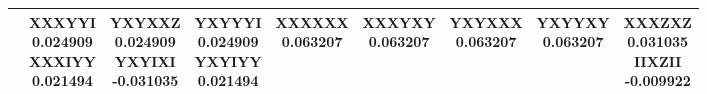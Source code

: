 \documentclass[twocolumn]{revtex4-1}
\newcommand{\1}{\mathbbm{1}}
\begin{document}
\begin{longtable}{|c|c|c|c|c|c|c|c|c|}
{\vspace{.5\baselineskip}}
&
\parbox{1.9cm}{\centering\vspace{.5\baselineskip}
XXXYYI\\
0.024909\\ 
XXXIYY\\
0.021494\\ 
\vspace{.5\baselineskip}}
&
\parbox{1.9cm}{\centering\vspace{.5\baselineskip}
YXYXXZ\\
0.024909\\ 
YXYIXI\\
-0.031035\\ 
\vspace{.5\baselineskip}}
&
\parbox{1.9cm}{\centering\vspace{.5\baselineskip}
YXYYYI\\
0.024909\\ 
YXYIYY\\
0.021494\\ 
\vspace{.5\baselineskip}}
&
\parbox{1.9cm}{\centering\vspace{.5\baselineskip}
XXXXXX\\
0.063207\\ 
\vspace{.5\baselineskip}}
&
\parbox{1.9cm}{\centering\vspace{.5\baselineskip}
XXXYXY\\
0.063207\\ 
\vspace{.5\baselineskip}}
&
\parbox{1.9cm}{\centering\vspace{.5\baselineskip}
YXYXXX\\
0.063207\\ 
\vspace{.5\baselineskip}}
&
\parbox{1.9cm}{\centering\vspace{.5\baselineskip}
YXYYXY\\
0.063207\\ 
\vspace{.5\baselineskip}}
&
\parbox{1.9cm}{\centering\vspace{.5\baselineskip}
XXXZXZ\\
0.031035\\ 
IIXZII\\
-0.009922\\ 
\vspace{.5\baselineskip}}\\		
\hline													%

\end{longtable}
\end{document}
